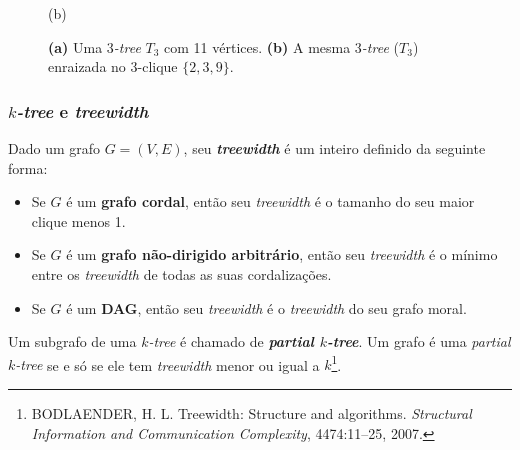 \documentclass{beamer}
\begin{document}
\begin{frame}
\begin{figure}
\begin{minipage}{0.5\textwidth}
{
        }

        (b)
      \end{minipage}

      \caption{
        \textbf{(a)} Uma \emph{$3$-tree} $T_3$ com 11 vértices.
        \textbf{(b)} A mesma \emph{$3$-tree} ($T_3$) enraizada no $3$-clique $\{2, 3, 9\}$.
      }
      \label{fig:rootedktree}
    \end{figure}
  \end{frame}

  \begin{frame}
    \frametitle{\emph{$k$-tree} e \emph{treewidth}}

    Dado um grafo $G = (V, E)$, seu \textbf{\emph{treewidth}} é um inteiro definido da seguinte forma:

    \begin{itemize}
      \item Se $G$ é um \textbf{grafo cordal}, então seu \emph{treewidth} é o tamanho do seu maior clique menos 1.
      \item Se $G$ é um \textbf{grafo não-dirigido arbitrário}, então seu \emph{treewidth} é o mínimo entre os \emph{treewidth} de todas as suas cordalizações.
      \item Se $G$ é um \textbf{DAG}, então seu \emph{treewidth} é o \emph{treewidth} do seu grafo moral.
    \end{itemize}

    Um subgrafo de uma \emph{$k$-tree} é chamado de \textbf{\emph{partial $k$-tree}}. Um grafo é uma \emph{partial $k$-tree} se e só se ele tem \emph{treewidth} menor ou igual a $k$\footnote{\scriptsize BODLAENDER, H. L. Treewidth: Structure and algorithms. \emph{Structural Information and Communication Complexity}, 4474:11--25, 2007.}.
  \end{frame}
\end{document}
